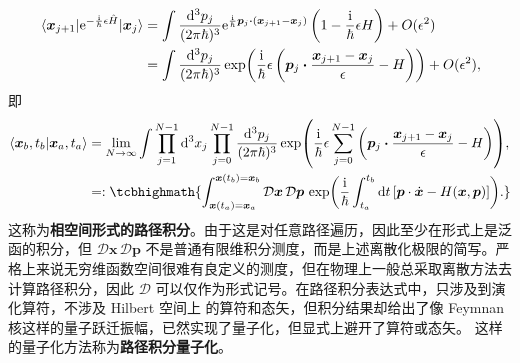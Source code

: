 \begin{align*}
    \mel{\bm x_{j+1}}{\e^{-\frac{\i}{\hbar}\epsilon\hat H}}{\bm x_j} &= \int\frac{\d[3]{p_j}}{(2\pi\hbar)^3} \e^{\frac{\i}{\hbar}\bm p_j\vdot(\bm x_{j+1}-\bm x_j)} \left(1 - \frac{\i}{\hbar}\epsilon H\right) + O(\epsilon^2)\\
    &= \int\frac{\d[3]{p_j}}{(2\pi\hbar)^3} \exp(\frac{\i}{\hbar}\epsilon \left(\bm p_j\vdot\frac{\bm x_{j+1}-\bm x_j}{\epsilon}-H\right)) + O(\epsilon^2),
\end{align*}
即
\begin{align}
    \ip{\bm x_b,t_b}{\bm x_a,t_a} &= \lim_{N\to\infty} \int\prod_{j=1}^{N-1}\d[3]{x_j} \prod_{j=0}^{N-1} \frac{\d[3]{p_j}}{(2\pi\hbar)^3} \exp(\frac{\i}{\hbar}\epsilon\sum_{j=0}^{N-1}\left(\bm p_j\vdot\frac{\bm x_{j+1}-\bm x_j}{\epsilon}-H\right)),\notag \\
    &=: \tcbhighmath{\int_{\bm x(t_a)=\bm x_a}^{\bm x(t_b)=\bm x_b}
    \mathcal D\bm x\,\mathcal D\bm p\,
    \exp(
        \frac{\i}{\hbar}
        \int_{t_a}^{t_b}\d{t}
        \left[\bm p\cdot\dot{\bm x}-H(\bm x,\bm p)\right]
    ).}
\end{align}
这称为\textbf{相空间形式的路径积分}。由于这是对任意路径遍历，因此至少在形式上是泛函的积分，但 $\mathcal D\bm x\,\mathcal D\bm p$ 不是普通有限维积分测度，而是上述离散化极限的简写。严格上来说无穷维函数空间很难有良定义的测度，但在物理上一般总采取离散方法去计算路径积分，因此 $\mathcal D$ 可以仅作为形式记号。在路径积分表达式中，只涉及到演化算符，不涉及 Hilbert 空间上
的算符和态矢，但积分结果却给出了像 Feymnan 核这样的量子跃迁振幅，已然实现了量子化，但显式上避开了算符或态矢。
这样的量子化方法称为\textbf{路径积分量子化}。

